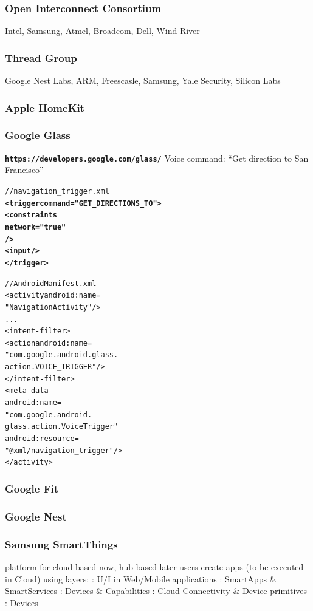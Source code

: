\documentclass{myproc}
\begin{document}
\subsubsection{\textcolor{red2}{\textbf{}Open Interconnect Consortium}}
\bit
\w Intel, Samsung, Atmel, Broadcom, Dell, Wind River
\eit
\subsubsection{\textcolor{red2}{\textbf{}Thread Group}}
\bit
\w Google Nest Labs, ARM, Freescasle, Samsung, Yale Security, Silicon Labs
\eit



\subsubsection{Apple HomeKit}



\subsubsection{Google Glass}
\bit
\w \textcolor{blue2}{\bf\texttt{https://developers.google.com/glass/}}
\w Voice command: ``Get direction to San Francisco''
\begin{alltt}
  // navigation_trigger.xml
  \textbf{<trigger command="GET_DIRECTIONS_TO">
    <constraints
      network="true"
    />
    <input />
  </trigger>}
\end{alltt}

\begin{alltt}
  // AndroidManifest.xml
  <activity android:name=
            "NavigationActivity" />
    ...
    <intent-filter>
      <action android:name=
       "com.google.android.glass.
            action.VOICE_TRIGGER"/>
    </intent-filter>
    <meta-data
      android:name=
        "com.google.android.
             glass.action.VoiceTrigger"
      android:resource=
        "@xml/navigation_trigger"/>
  </activity>
\end{alltt}

\eit
\subsubsection{Google Fit}
\subsubsection{Google Nest}

\subsubsection{\textcolor{red2}{\bf{}Samsung SmartThings}}
\bit
\w platform for \textcolor{red2}{}
\w cloud-based now, hub-based later
\w users create apps (to be executed in Cloud) using 
\w layers:
  \ben
  \w {}: U/I in Web/Mobile applications
  \w {}: SmartApps \& SmartServices
  \w {}: Devices \& Capabilities
  \w {}: Cloud Connectivity \& Device
primitives 
  \w {}: Devices
  \een
\eit
\end{document}
